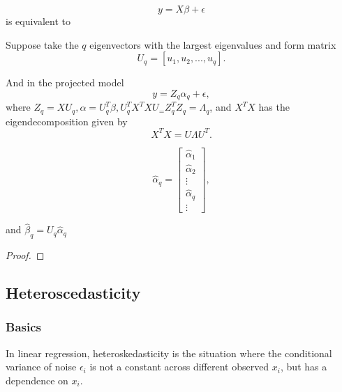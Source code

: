 \begin{refsection}
\begin{remark}

\end{remark}



\begin{lemma}\cite[355]{montgomery2012introduction}
	$$y = X\beta + \epsilon$$
	is equivalent to

	
	Suppose take the $q$ eigenvectors with the largest eigenvalues and form matrix	$$U_q = [u_1,u_2,...,u_q].$$
	
	And in the projected model
		$$y = Z_q\alpha_q + \epsilon,$$
	where $Z_q = XU_q, \alpha = U^T_q\beta, U^T_qX^TXU_ = Z^T_qZ_q = \Lambda_q$, and $X^TX$ has the eigendecomposition given by
	$$X^TX = U\Lambda U^T.$$	
	
	
	$$\hat{\alpha}_q = \begin{bmatrix}
	\hat{\alpha}_1\\
	\hat{\alpha}_2\\
	\vdots \\
	\hat{\alpha}_q\\
	\vdots
	\end{bmatrix},$$
	
	and $\hat{\beta}_q = U_q \hat{\alpha}_q$
\end{lemma}
\begin{proof}
	
\end{proof}


\subsection{Heteroscedasticity}

\subsubsection{Basics}

\begin{definition}[heteroskedasticity]
	In linear regression, heteroskedasticity is the situation where	the conditional variance of noise $\epsilon_i$ is not a constant across different observed $x_i$, but has a dependence on $x_i$.
\end{definition}


\end{refsection}
